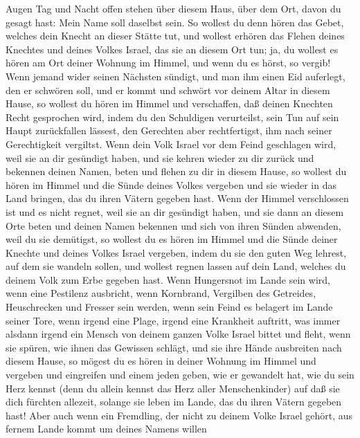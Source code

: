 Augen Tag und Nacht offen stehen über diesem Haus, über dem Ort, davon
du gesagt hast: Mein Name soll daselbst sein. So wollest du denn hören
das Gebet, welches dein Knecht an dieser Stätte tut,  und
wollest erhören das Flehen deines Knechtes und deines Volkes Israel, das
sie an diesem Ort tun; ja, du wollest es hören am Ort deiner Wohnung im
Himmel, und wenn du es hörst, so vergib!  Wenn jemand
wider seinen Nächsten sündigt, und man ihm einen Eid auferlegt, den er
schwören soll, und er kommt und schwört vor deinem Altar in diesem
Hause,  so wollest du hören im Himmel und verschaffen,
daß deinen Knechten Recht gesprochen wird, indem du den Schuldigen
verurteilst, sein Tun auf sein Haupt zurückfallen lässest, den Gerechten
aber rechtfertigst, ihm nach seiner Gerechtigkeit vergiltst.
 Wenn dein Volk Israel vor dem Feind geschlagen wird,
weil sie an dir gesündigt haben, und sie kehren wieder zu dir zurück und
bekennen deinen Namen, beten und flehen zu dir in diesem Hause,
 so wollest du hören im Himmel und die Sünde deines
Volkes vergeben und sie wieder in das Land bringen, das du ihren Vätern
gegeben hast.  Wenn der Himmel verschlossen ist und es
nicht regnet, weil sie an dir gesündigt haben, und sie dann an diesem
Orte beten und deinen Namen bekennen und sich von ihren Sünden abwenden,
weil du sie demütigst,  so wollest du es hören im Himmel
und die Sünde deiner Knechte und deines Volkes Israel vergeben, indem du
sie den guten Weg lehrest, auf dem sie wandeln sollen, und wollest
regnen lassen auf dein Land, welches du deinem Volk zum Erbe gegeben
hast.  Wenn Hungersnot im Lande sein wird, wenn eine
Pestilenz ausbricht, wenn Kornbrand, Vergilben des Getreides,
Heuschrecken und Fresser sein werden, wenn sein Feind es belagert im
Lande seiner Tore, wenn irgend eine Plage, irgend eine Krankheit
auftritt,  was immer alsdann irgend ein Mensch von deinem
ganzen Volke Israel bittet und fleht, wenn sie spüren, wie ihnen das
Gewissen schlägt, und sie ihre Hände ausbreiten nach diesem Hause,
 so mögest du es hören in deiner Wohnung im Himmel und
vergeben und eingreifen und einem jeden geben, wie er gewandelt hat, wie
du sein Herz kennst (denn du allein kennst das Herz aller
Menschenkinder)  auf daß sie dich fürchten allezeit,
solange sie leben im Lande, das du ihren Vätern gegeben hast!
 Aber auch wenn ein Fremdling, der nicht zu deinem Volke
Israel gehört, aus fernem Lande kommt um deines Namens willen
